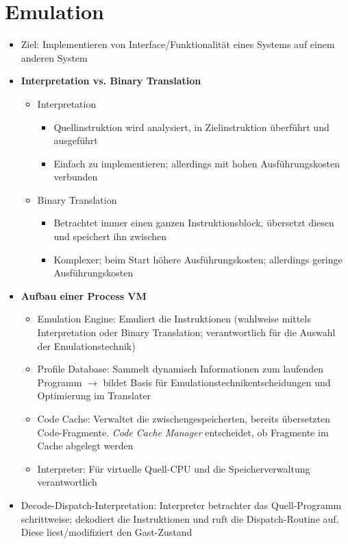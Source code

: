 \section{Emulation}
\begin{itemize}
	\item Ziel: Implementieren von Interface/Funktionalität eines Systems auf einem anderen System
	\item \textbf{Interpretation vs. Binary Translation}
	\begin{itemize}
		\item Interpretation
		\begin{itemize}
			\item Quellinstruktion wird analysiert, in Zielinstruktion überführt und ausgeführt
			\item Einfach zu implementieren; allerdings mit hohen Ausführungskosten verbunden
		\end{itemize}
		\item Binary Translation
		\begin{itemize}
			\item Betrachtet immer einen ganzen Instruktionsblock, übersetzt diesen und speichert ihn zwischen
			\item Komplexer; beim Start höhere Ausführungskosten; allerdings geringe Ausführungskosten
		\end{itemize}
	\end{itemize}
	\item \textbf{Aufbau einer Process VM}
	\begin{itemize}
		\item Emulation Engine: Emuliert die Instruktionen (wahlweise mittels Interpretation oder Binary Translation; verantwortlich für die Auswahl der Emulationstechnik)
		\item Profile Database: Sammelt dynamisch Informationen zum laufenden Programm \(\rightarrow\) bildet Basis für Emulationstechnikentscheidungen und Optimierung im Translater
		\item Code Cache: Verwaltet die zwischengespeicherten, bereits übersetzten Code-Fragmente. \textit{Code Cache Manager} entscheidet, ob Fragmente im Cache abgelegt werden
		\item Interpreter: Für virtuelle Quell-CPU und die Speicherverwaltung verantwortlich
	\end{itemize}
	\item Decode-Dispatch-Interpretation: Interpreter betrachter das Quell-Programm schrittweise; dekodiert die Instruktionen und ruft die Dispatch-Routine auf. Diese liest/modifiziert den Gast-Zustand

\end{itemize}
